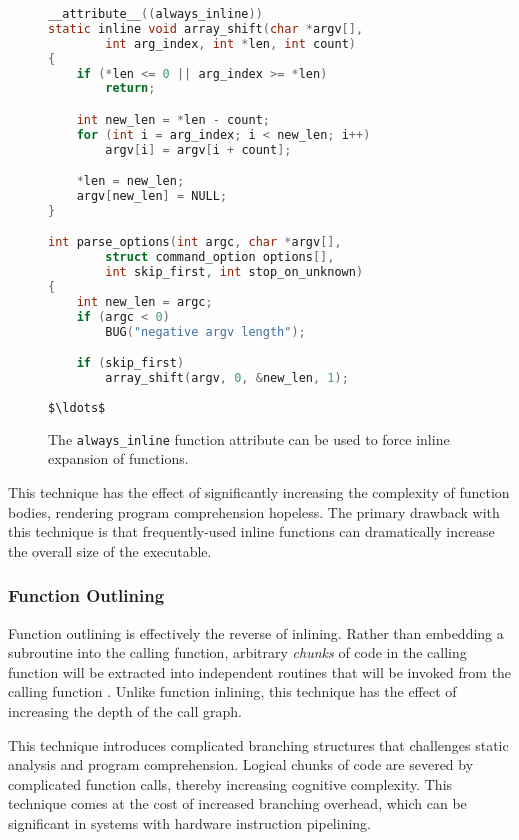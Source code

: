 \documentclass[conference]{IEEEtran}
\begin{document}
\begin{figure}[h]
\begin{lstlisting}[language=C,basicstyle=\footnotesize,mathescape=true]
__attribute__((always_inline))
static inline void array_shift(char *argv[],
		int arg_index, int *len, int count)
{
	if (*len <= 0 || arg_index >= *len)
		return;

	int new_len = *len - count;
	for (int i = arg_index; i < new_len; i++)
		argv[i] = argv[i + count];

	*len = new_len;
	argv[new_len] = NULL;
}

int parse_options(int argc, char *argv[],
		struct command_option options[],
		int skip_first, int stop_on_unknown)
{
	int new_len = argc;
	if (argc < 0)
		BUG("negative argv length");

	if (skip_first)
		array_shift(argv, 0, &new_len, 1);
		
$\ldots$
\end{lstlisting}
\caption{The \texttt{always\_inline} function attribute can be used to force inline expansion of functions.}
\label{fig:inline-fun-attr-usage}
\end{figure}

This technique has the effect of significantly increasing the complexity of function bodies, rendering program comprehension hopeless. The primary drawback with this technique is that frequently-used inline functions can dramatically increase the overall size of the executable.

\subsubsection{Function Outlining}
Function outlining is effectively the reverse of inlining. Rather than embedding a subroutine into the calling function, arbitrary \textit{chunks} of code in the calling function will be extracted into independent routines that will be invoked from the calling function \cite{b7}. Unlike function inlining, this technique has the effect of increasing the depth of the call graph.

This technique introduces complicated branching structures that challenges static analysis and program comprehension. Logical chunks of code are severed by complicated function calls, thereby increasing cognitive complexity. This technique comes at the cost of increased branching overhead, which can be significant in systems with hardware instruction pipelining.
\end{document}
